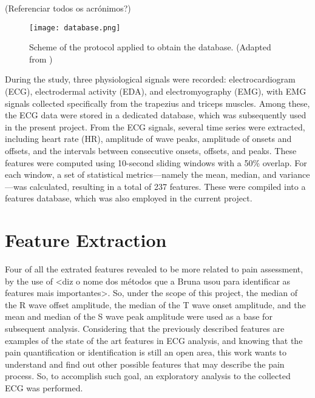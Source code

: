 (Referenciar todos os acrónimos?)

\begin{figure}[h!]
    \centering
    \texttt{[image: database.png]}
    \caption{Scheme of the protocol applied to obtain the database. (Adapted from \cite{Alves2024})}
    \label{fig:database}
\end{figure}

During the study, three physiological signals were recorded: electrocardiogram (ECG), electrodermal activity (EDA), and electromyography (EMG), with EMG signals collected specifically from the trapezius and triceps muscles. Among these, the ECG data were stored in a dedicated database, which was subsequently used in the present project.
From the ECG signals, several time series were extracted, including heart rate (HR), amplitude of wave peaks, amplitude of onsets and offsets, and the intervals between consecutive onsets, offsets, and peaks. These features were computed using 10-second sliding windows with a 50\% overlap.
For each window, a set of statistical metrics—namely the mean, median, and variance—was calculated, resulting in a total of 237 features. These were compiled into a features database, which was also employed in the current project.




\section{Feature Extraction}
Four of all the extrated features revealed to be more related to pain assessment, by the use of <diz o nome dos métodos que a Bruna usou para identificar as features mais importantes>. So, under the scope of this project, the median
of the R wave offset amplitude, the median of the T wave onset amplitude, and the mean and
median of the S wave peak amplitude were used as a base for subsequent analysis.
Considering that the previously described features are examples of the state of the art features in ECG analysis, and knowing that the pain quantification or identification is still an open area, this work wants to understand and find out other possible features that may describe the pain process. So, to accomplish such goal, an exploratory analysis to the collected ECG was performed.


